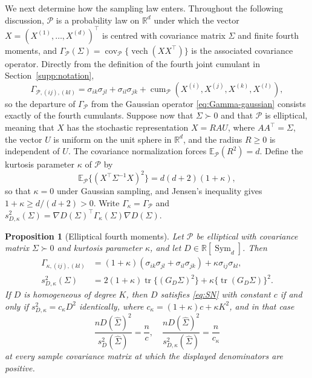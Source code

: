 \documentclass[12pt,a4paper]{article}
\theoremstyle{plain}
\newtheorem{proposition}{Proposition}
\theoremstyle{definition}
\newcommand{\R}{\mathbb{R}}
\newcommand{\E}{\mathbb{E}}
\newcommand{\Sym}{\operatorname{Sym}}
\newcommand{\tr}{\operatorname{tr}}
\newcommand{\vech}{\operatorname{vech}}
\newcommand{\cov}{\operatorname{cov}}
\newcommand{\cum}{\operatorname{cum}}
\newcommand{\Sighat}{\hat{\Sigma}}
\begin{document}
We next determine how the sampling law enters.
Throughout the following discussion, $\mathcal{P}$ is a probability law on $\R^d$ under which the vector $X=(X^{(1)}, \ldots, X^{(d)})^\top$ is centred with covariance matrix $\Sigma$ and finite fourth moments, and $\Gamma_{\mathcal{P}}(\Sigma)=\cov_{\mathcal{P}}\{\vech(XX^\top)\}$ is the associated covariance operator.
Directly from the definition of the fourth joint cumulant in Section~\ref{supp:notation},
\begin{equation}
\label{eq:general-fourth}
    \Gamma_{\mathcal{P},(ij),(kl)}
    =
    \sigma_{ik}\sigma_{jl}+\sigma_{il}\sigma_{jk}+\cum_{\mathcal{P}}(X^{(i)},X^{(j)},X^{(k)},X^{(l)})
    ,
\end{equation}
so the departure of $\Gamma_{\mathcal{P}}$ from the Gaussian operator \eqref{eq:Gamma-gaussian} consists exactly of the fourth cumulants.
Suppose now that $\Sigma\succ0$ and that $\mathcal{P}$ is elliptical, meaning that $X$ has the stochastic representation $X=RAU$, where $AA^\top=\Sigma$, the vector $U$ is uniform on the unit sphere in $\R^d$, and the radius $R\ge0$ is independent of $U$.
The covariance normalization forces $\E_{\mathcal{P}}(R^2)=d$.
Define the kurtosis parameter $\kappa$ of $\mathcal{P}$ by
\begin{equation}
\label{eq:elliptical-kappa}
    \E_{\mathcal{P}}\{(X^\top\Sigma^{-1}X)^2\}
    =
    d(d+2)(1+\kappa)
    ,
\end{equation}
so that $\kappa=0$ under Gaussian sampling, and Jensen's inequality gives $1+\kappa\ge d/(d+2)>0$.
Write $\Gamma_\kappa=\Gamma_{\mathcal{P}}$ and $s_{D,\kappa}^2(\Sigma)=\nabla D(\Sigma)^\top\Gamma_\kappa(\Sigma)\nabla D(\Sigma)$.

\begin{proposition}[Elliptical fourth moments]
\label{prop:elliptical}
    Let $\mathcal{P}$ be elliptical with covariance matrix $\Sigma\succ0$ and kurtosis parameter $\kappa$, and let $D\in\R[\Sym_d]$.
    Then
    \begin{align}
        \Gamma_{\kappa,(ij),(kl)}
        &=
        (1+\kappa)(\sigma_{ik}\sigma_{jl}+\sigma_{il}\sigma_{jk})
        +\kappa\sigma_{ij}\sigma_{kl}
        ,
        \label{eq:elliptical-Gamma}\\
        s_{D,\kappa}^2(\Sigma)
        &=
        2(1+\kappa)\tr\{(G_D\Sigma)^2\}
        +\kappa\{\tr(G_D\Sigma)\}^2
        .
        \label{eq:elliptical-sD}
    \end{align}
    If $D$ is homogeneous of degree $K$, then $D$ satisfies \eqref{eq:SN} with constant $c$ if and only if $s_{D,\kappa}^2=c_\kappa D^2$ identically, where $c_\kappa=(1+\kappa)c + \kappa K^2$, and in that case
    \begin{equation}
    \label{eq:elliptical-samplewise}
        \frac{nD(\Sighat)^2}{s_D^2(\Sighat)}
        =
        \frac{n}{c}
        ,\quad
        \frac{nD(\Sighat)^2}{s_{D,\kappa}^2(\Sighat)}
        =
        \frac{n}{c_\kappa}
    \end{equation}
    at every sample covariance matrix at which the displayed denominators are positive.
\end{proposition}
\end{document}
